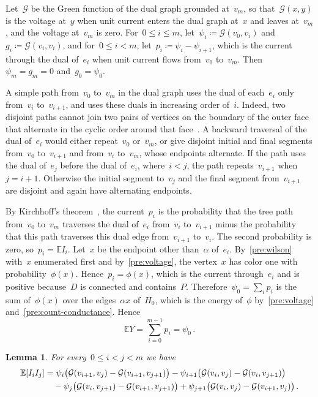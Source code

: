 \documentclass[11pt]{amsart}
\numberwithin{equation}{section}
\newtheorem{lemma}[equation]{Lemma}
\newcommand{\EE}{\mathbb E}
\begin{document}
Let~$\mathcal G$ be the Green function of the dual graph grounded at~$v_m$, so that~$\mathcal G(x,y)$ is the voltage at~$y$ when unit current enters the dual graph at~$x$ and leaves at~$v_m$, and the voltage at~$v_m$ is zero. For~$0\leq i\leq m$, let~$\psi_i\coloneqq\mathcal G(v_0,v_i)$ and~$g_i\coloneqq\mathcal G(v_i,v_i)$, and for~$0\leq i<m$, let~$p_i\coloneqq\psi_i-\psi_{i+1}$, which is the current through the dual of~$e_i$ when unit current flows from~$v_0$ to~$v_m$. Then~$\psi_m=g_m=0$ and~$g_0=\psi_0$.

A simple path from~$v_0$ to~$v_m$ in the dual graph uses the dual of each~$e_i$ only from~$v_i$ to~$v_{i+1}$, and uses these duals in increasing order of~$i$. Indeed, two disjoint paths cannot join two pairs of vertices on the boundary of the outer face that alternate in the cyclic order around that face~\citep[Section~1.1]{KenyonWilson2011}. A backward traversal of the dual of~$e_i$ would either repeat~$v_0$ or~$v_m$, or give disjoint initial and final segments from~$v_0$ to~$v_{i+1}$ and from~$v_i$ to~$v_m$, whose endpoints alternate. If the path uses the dual of~$e_j$ before the dual of~$e_i$, where~$i<j$, the path repeats~$v_{i+1}$ when~$j=i+1$. Otherwise the initial segment to~$v_j$ and the final segment from~$v_{i+1}$ are disjoint and again have alternating endpoints.

By Kirchhoff's theorem~\citep[Exercise~4.23]{LyonsPeres2016}, the current~$p_i$ is the probability that the tree path from~$v_0$ to~$v_m$ traverses the dual of~$e_i$ from~$v_i$ to~$v_{i+1}$ minus the probability that this path traverses this dual edge from~$v_{i+1}$ to~$v_i$. The second probability is zero, so~$p_i=\EE I_i$. Let~$x$ be the endpoint other than~$\alpha$ of~$e_i$. By~\eqref{pre:wilson} with~$x$ enumerated first and by~\eqref{pre:voltage}, the vertex~$x$ has color one with probability~$\phi(x)$. Hence~$p_i=\phi(x)$, which is the current through~$e_i$ and is positive because~$D$ is connected and contains~$P$. Therefore~$\psi_0=\sum_ip_i$ is the sum of~$\phi(x)$ over the edges~$\alpha x$ of~$H_0$, which is the energy of~$\phi$ by~\eqref{pre:voltage} and~\eqref{pre:count-conductance}. Hence
\begin{equation*}
 \EE Y=\sum_{i=0}^{m-1}p_i=\psi_0\,.
\end{equation*}

\begin{lemma}\label{el:pair-contact}
For every~$0\leq i<j<m$ we have
\begin{align}\label{el:pair-expanded}
 \EE[I_iI_j]
 &=\psi_i\bigl(\mathcal G(v_{i+1},v_j)-\mathcal G(v_{i+1},v_{j+1})\bigr)
   -\psi_{i+1}\bigl(\mathcal G(v_i,v_j)-\mathcal G(v_i,v_{j+1})\bigr)\notag\\
 &\quad-\psi_j\bigl(\mathcal G(v_i,v_{j+1})-\mathcal G(v_{i+1},v_{j+1})\bigr)
   +\psi_{j+1}\bigl(\mathcal G(v_i,v_j)-\mathcal G(v_{i+1},v_j)\bigr)\,.
\end{align}
\end{lemma}
\end{document}
